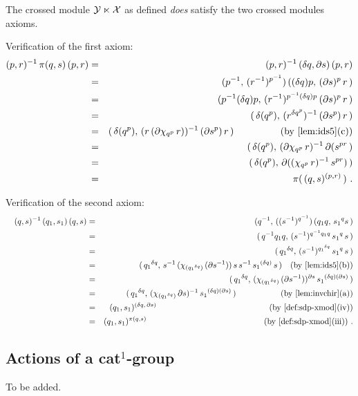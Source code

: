 \begin{thm}
The crossed module  $\mathcal{Y} \ltimes \mathcal{X}$  as defined
\emph{does} satisfy the two crossed modules axioms.
\end{thm}
\begin{pf}
Verification of the first axiom:
\begin{eqnarray*}
(p,r)^{-1}\,\pi(q,s)\,(p,r)
  & = &
   (p,r)^{-1}\,
      (\delta q, \partial s)\,
         (p,r)  \\
  & = &
   (p^{-1},\, (r^{-1})^{p^{-1}})\,
      ((\delta q)p,\, (\partial s)^p\,r\,)  \\
  & = &
   (p^{-1}(\delta q)p,\, 
      (r^{-1})^{p^{-1}(\delta q)p}\,(\partial s)^p\,r\,)  \\
  & = &
   (\,\delta(q^p),\, 
      (r^{\delta q^p})^{-1}\,(\partial s^p)\,r\,)  \\
  & = &
   (\,\delta(q^p),\, 
      (r\,(\partial\chi_{q^p}\,r))^{-1}\,(\partial s^p)\,r\,)
         \hspace{17mm} \mbox{(by \ref{lem:ids5}(c))}  \\
  & = &
   (\,\delta(q^p),\, (\partial\chi_{q^p}\,r)^{-1}\,
       \partial(s^{pr}\,) \\
  & = &
   (\,\delta(q^p),\, \partial( (\chi_{q^p}\,r)^{-1}\, s^{pr} )\,) \\
  & = &
   \pi(\,(q,s)^{(p,r)}\,) ~.
\end{eqnarray*}

\noindent
Verification of the second axiom:
\begin{eqnarray*}\quad
(q,s)^{-1}\,(q_1,s_1)\,(q,s)
  & = &
    (q^{-1},\,((s^{-1})^{q^{-1}})\,(q_1q,\,{s_1}^qs\,)  \\
  & = &
    (\,q^{-1}q_1q,\,(s^{-1})^{q^{-1}q_1q}\,{s_1}^q\,s\,)  \\
  & = &
    (\,{q_1}^{\delta q},\,(s^{-1})^{{q_1}^{\delta q}}\,{s_1}^q\,s\,)\\
  & = &
    (\,{q_1}^{\delta q},\, s^{-1}\,(\chi_{({q_1}^{\delta q})}\,
      (\partial s^{-1}))\,s\,s^{-1}\,
      {s_1}^{(\delta q)}\,s\,) 
         \quad \mbox{(by \ref{lem:ids5}(b))}  \\
  & = &
    (\,{q_1}^{\delta q},\, (\chi_{({q_1}^{\delta q})}\,
      (\partial s^{-1}))^{\partial s}\,
      {s_1}^{(\delta q)(\partial s)}\,) \\
  & = &
    (\,{q_1}^{\delta q},\, (\chi_{({q_1}^{\delta q})}\,\partial s)^{-1}\,
      {s_1}^{(\delta q)(\partial s)}\,) 
         \hspace{19mm} \mbox{(by \ref{lem:invchir}(a))}  \\
  & = &
    (q_1,s_1)^{(\delta q,\,\partial s)}  
         \hspace{48mm} \mbox{(by \ref{def:sdp-xmod}(iv))}  \\
  & = &
    (q_1,s_1)^{\pi(q,s)}
         \hspace{50mm} \mbox{(by \ref{def:sdp-xmod}(iii))} ~. \\
\end{eqnarray*}
\end{pf}


\subsection{Actions of a cat$^1$-group}

\begin{defn}
To be added.
\end{defn}
